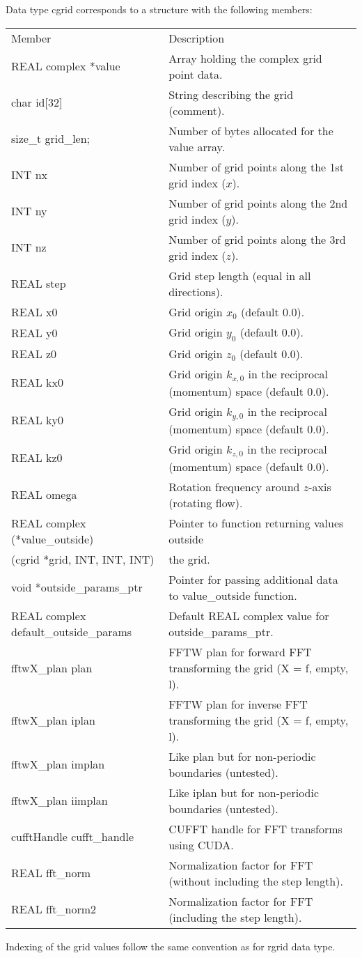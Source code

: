 \documentclass[12pt,letterpaper]{article}
\begin{document}
Data type cgrid corresponds to a structure with the following members:
\begin{longtable}{p{} p{}}
Member & Description\\
\cline{1-2}
REAL complex *value & Array holding the complex grid point data.\\
char id[32] & String describing the grid (comment).\\ 
size\_t grid\_len; & Number of bytes allocated for the value array.\\
INT nx & Number of grid points along the 1st grid index ($x$).\\
INT ny & Number of grid points along the 2nd grid index ($y$).\\
INT nz & Number of grid points along the 3rd grid index ($z$).\\
REAL step & Grid step length (equal in all directions).\\
REAL x0 & Grid origin $x_0$ (default 0.0).\\
REAL y0 & Grid origin $y_0$ (default 0.0).\\
REAL z0 & Grid origin $z_0$ (default 0.0).\\
REAL kx0 & Grid origin $k_{x,0}$ in the reciprocal (momentum) space (default 0.0).\\
REAL ky0 & Grid origin $k_{y,0}$ in the reciprocal (momentum) space (default 0.0).\\
REAL kz0 & Grid origin $k_{z,0}$ in the reciprocal (momentum) space (default 0.0).\\
REAL omega & Rotation frequency around $z$-axis (rotating flow).\\
REAL complex (*value\_outside) & Pointer to function returning values outside\\
\phantom{X}(cgrid *grid, INT, INT, INT) & the grid.\\
void *outside\_params\_ptr & Pointer for passing additional data to value\_outside function.\\
REAL complex default\_outside\_params & Default REAL complex value for outside\_params\_ptr.\\
fftwX\_plan plan & FFTW plan for forward FFT transforming the grid (X = f, empty, l).\\
fftwX\_plan iplan & FFTW plan for inverse FFT transforming the grid (X = f, empty, l).\\
fftwX\_plan implan & Like plan but for non-periodic boundaries (untested).\\
fftwX\_plan iimplan & Like iplan but for non-periodic boundaries (untested).\\
cufftHandle cufft\_handle & CUFFT handle for FFT transforms using CUDA.\\
REAL fft\_norm & Normalization factor for FFT (without including the step length).\\
REAL fft\_norm2 & Normalization factor for FFT (including the step length).\\
\end{longtable}
\noindent
Indexing of the grid values follow the same convention as for rgrid data type.
\end{document}
